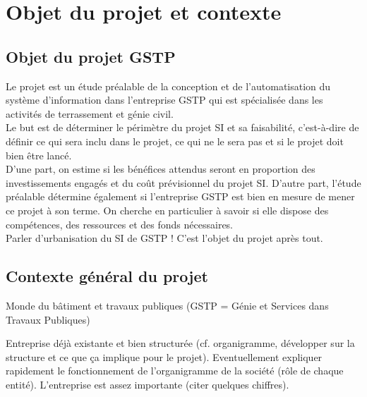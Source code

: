 \section{Objet du projet et contexte}

\subsection{Objet du projet GSTP}
Le projet est un étude préalable de la conception et de l'automatisation du système d'information dans l'entreprise GSTP qui est spécialisée dans les activités de terrassement et génie civil.\\

Le but est de déterminer le périmètre du projet SI et sa faisabilité, c’est-à-dire de définir ce qui sera inclu dans le projet, ce qui ne le sera pas et si le projet doit bien être lancé.\\

D’une part, on estime si les bénéfices attendus seront en proportion des investissements engagés et du coût prévisionnel du projet SI.
D’autre part, l’étude préalable détermine également si l’entreprise GSTP est bien en mesure de mener ce projet à son terme. On cherche en particulier à savoir si elle dispose des compétences, des ressources et des fonds nécessaires.\\

Parler d'urbanisation du SI de GSTP ! C'est l'objet du projet après tout.


\subsection{Contexte général du projet}

Monde du bâtiment et travaux publiques (GSTP = Génie et Services dans Travaux Publiques)

Entreprise déjà existante et bien structurée (cf. organigramme, développer sur la structure et ce que ça implique pour le projet). Eventuellement expliquer rapidement le fonctionnement de l'organigramme de la société (rôle de chaque entité). L'entreprise est assez importante (citer quelques chiffres).

